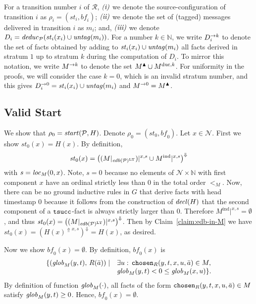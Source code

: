 \documentclass{tlp}
\newcommand{\Nat}{\mathbb{N}}  \newcommand{\len}[1]{|#1|} \newcommand{\rom}[1]{\text{\emph{(#1)}}} \newcommand{\romI}{\rom i}
\newcommand{\romII}{\rom{ii}}
\newcommand{\romIII}{\rom{iii}}
\newcommand{\ded}{\mathcal{P}}
\newcommand{\proj}[2]{#1|_{#2}}
\newcommand{\edb}[1]{\fname{edb}(#1)}
\newcommand{\nw}{\mathcal{N}}
\newcommand{\sh}[1]{(#1)}
\newcommand{\toloct}[1]{#1^{\mathrm{LT}}}
\newcommand{\addlt}[3]{#1^{\Uparrow#2,#3}}
\newcommand{\projlt}[3]{#1|^{#2,#3}}
\newcommand{\shprojlt}[3]{\projlt{\sh{#1}}{#2}{#3}}
\newcommand{\droplt}[1]{#1^{\Downarrow}}
\newcommand{\timesucc}{\pred{tsucc}}
\newcommand{\chosen}{\pred{chosen}}
\newcommand{\decl}[1]{\fname{decl}(#1)}
\newcommand{\cnf}{\rho}
\newcommand{\cnfstart}[2]{\fname{\fname{start}}(#1,#2)}
\newcommand{\cnfs}{\mathit{st}}
\newcommand{\cnfb}{\mathit{bf}}
\newcommand{\pair}[2]{(#1,#2)}
\newcommand{\run}{\mathcal{R}}
\newcommand{\untag}[1]{\fname{untag}(#1)}
\newcommand{\deduc}[1]{\fname{deduc}_{#1}}
\newcommand{\nwnat}{\nw\times\Nat}
\newcommand{\grded}{G}
\newcommand{\totM}{<_{M}}
\newcommand{\globM}[1]{\fname{glob}_{M}(#1)}
\newcommand{\locM}[1]{\fname{loc}_{M}(#1)}
\newcommand{\Mind}{M^{\mathrm{ind}}}
\begin{document}
\begin{appendix}
For a transition number $i$ of $\run$, $\romI$ we denote the source-configuration
of transition $i$ as $\cnf_{i}=(\cnfs_{i},\cnfb_{i})$; $\romII$
we denote the set of (tagged) messages delivered in transition $i$
as $m_{i}$; and, $\romIII$ we denote $D_{i}=\deduc{\ded}(\cnfs_{i}(x_{i})\cup\untag{m_{i}})$.
For a number $k\in\Nat$, we write $D_{i}^{\to k}$ to denote the
set of facts obtained by adding to $\cnfs_{i}(x_{i})\cup\untag{m_{i}}$
all facts derived in stratum $1$ up to stratum $k$ during the computation
of $D_{i}$. To mirror this notation, we write $M^{\to k}$ to denote
the set $M^{\blacktriangle}\cup M^{\mathrm{duc},k}$. For uniformity in the proofs, we will
consider the case $k=0$, which is an invalid stratum number, and
this gives $\strat{D_{i}}0=\cnfs_{i}(x_{i})\cup\untag{m_{i}}$ and
$M^{\to0}=M^{\blacktriangle}$. 


\subsection{Valid Start}

\label{sub:model-to-run--valid-start}

We show that $\cnf_{0}=\cnfstart{\ded}H$. Denote $\cnf_{0}=(\cnfs_{0},\cnfb_{0})$.
Let $x\in\nw$. First we show $\cnfs_{0}(x)=H(x)$. By definition,
\[
\cnfs_{0}(x)=\droplt{\left(\shprojlt{\proj M{\toloct{\edb{\ded}}}}xs\cup\projlt{\Mind}xs\right)}
\]
with $s=\locM{0,x}$. Note, $s=0$ because no elements of $\nwnat$
with first component $x$ have an ordinal strictly less than $0$
in the total order $\totM$. Now, there can be no ground inductive
rules in $\grded$ that derive facts with head timestamp $0$ because
it follows from the construction of $\decl H$ that the second component
of a $\timesucc$-fact is always strictly larger than $0$. Therefore
$\projlt{\Mind}xs=\emptyset$, and thus $\cnfs_{0}(x)=\droplt{\left(\shprojlt{\proj M{\toloct{\edb{\ded}}}}xs\right)}$.
Then by Claim~\ref{claim:edb-in-M} we have $\cnfs_{0}(x)=\droplt{(\addlt{H(x)}xs)}=H(x)$,
as desired.

Now we show $\cnfb_{0}(x)=\emptyset$. By definition, $\cnfb_{0}(x)$
is
\[
\begin{array}{ll}
\{\pair{\globM{y,t}}{\, R(\bar{a})}\mid
    & \exists u:\,\chosen_{R}(y,t,x,u,\bar{a})\in M,\\&\globM{y,t}<0\leq\globM{x,u}\}.
\end{array}
\]
By definition of function $\globM{\cdot}$, all facts of the form
$\chosen_{R}(y,t,x,u,\bar{a})\in M$ satisfy $\globM{y,t}\geq0$.
Hence, $\cnfb_{0}(x)=\emptyset$.


\end{appendix}
\end{document}
